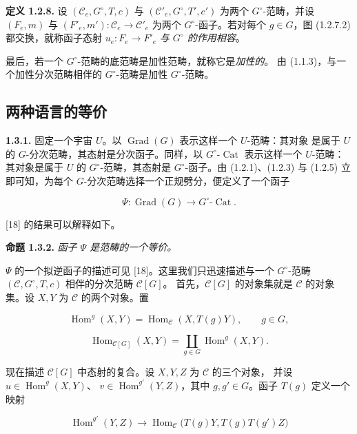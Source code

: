 \clearpage
{}%
\noindent\textbf{定义 1.2.8.}\quad
设 $(\mathcal C_e,G^\circ,T,c)$ 与
$(\mathcal C'_e,G^\circ,T',c')$ 为两个 $G^\circ$-范畴，并设
$(F_e,m)$ 与 $(F'_e,m')\colon\mathcal C_e\to\mathcal C'_e$ 为两个
$G^\circ$-函子。若对每个 $g\in G$，图 (1.2.7.2) 都交换，就称函子态射
$u_e\colon F_e\to F'_e$ \emph{与 $G^\circ$ 的作用相容}。

最后，若一个 $G^\circ$-范畴的底范畴是加性范畴，就称它是\emph{加性的}。
由 (1.1.3)，与一个加性分次范畴相伴的 $G^\circ$-范畴是加性
$G^\circ$-范畴。

\subsection{两种语言的等价}

\noindent\textbf{1.3.1.}\quad
固定一个宇宙 $U$。以 $\operatorname{Grad}(G)$ 表示这样一个 $U$-范畴：其对象
是属于 $U$ 的 $G$-分次范畴，其态射是分次函子。同样，以
$G^\circ\text{-}\operatorname{Cat}$ 表示这样一个 $U$-范畴：其对象是属于
$U$ 的 $G^\circ$-范畴，其态射是 $G^\circ$-函子。由 (1.2.1)、(1.2.3) 与
(1.2.5) 立即可知，为每个 $G$-分次范畴选择一个正规劈分，便定义了一个函子

\begin{equation}
  \Psi\colon \operatorname{Grad}(G)
  \longrightarrow G^\circ\text{-}\operatorname{Cat}.
  \tag{1.3.1.1}
\end{equation}

[18] 的结果可以解释如下。

\noindent\textbf{命题 1.3.2.}\quad
\emph{函子 $\Psi$ 是范畴的一个等价。}

$\Psi$ 的一个拟逆函子的描述可见 [18]。这里我们只迅速描述与一个
$G^\circ$-范畴 $(\mathcal C,G^\circ,T,c)$ 相伴的分次范畴 $\mathcal C[G]$。
首先，$\mathcal C[G]$ 的对象集就是 $\mathcal C$ 的对象集。设 $X,Y$ 为
$\mathcal C$ 的两个对象。置

\begin{equation}
  \operatorname{Hom}^{g}(X,Y)
  =\operatorname{Hom}_{\mathcal C}(X,T(g)Y),
  \qquad g\in G,
  \tag{1.3.2.1}
\end{equation}

\begin{equation}
  \operatorname{Hom}_{\mathcal C[G]}(X,Y)
  =\coprod_{g\in G}\operatorname{Hom}^{g}(X,Y).
  \tag{1.3.2.2}
\end{equation}

现在描述 $\mathcal C[G]$ 中态射的复合。设 $X,Y,Z$ 为 $\mathcal C$ 的三个对象，
并设 $u\in\operatorname{Hom}^{g}(X,Y)$、
$v\in\operatorname{Hom}^{g'}(Y,Z)$，其中 $g,g'\in G$。函子 $T(g)$ 定义一个映射

\begin{equation}
  \operatorname{Hom}^{g'}(Y,Z)
  \longrightarrow
  \operatorname{Hom}_{\mathcal C}
    \bigl(T(g)Y,T(g)T(g')Z\bigr)
  \tag{1.3.2.3}
\end{equation}
